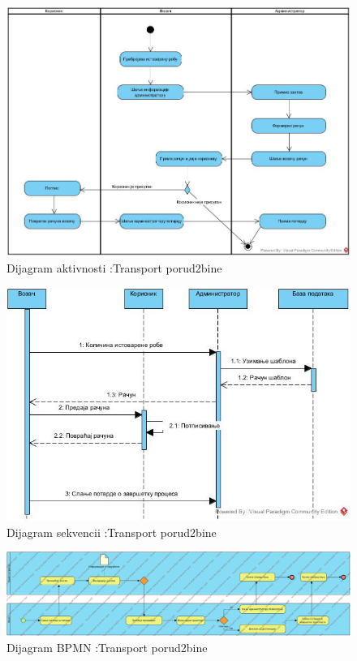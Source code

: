 \begin{figure}[H]
	\includegraphics[scale=0.4]{Slike/DFD/AD_transport.jpg}
	\centering
	\caption{Dijagram aktivnosti :Transport porud2bine}
	\label{ucDostavljanjeAktivnost}
\end{figure}
\begin{figure}[H]
	\includegraphics[scale=0.4]{Slike/DFD/DS_transport.jpg}
	\centering
	\caption{Dijagram sekvencii :Transport porud2bine}
	\label{ucDostavljanjeSekvence}
\end{figure}
\begin{figure}[H]
	\includegraphics[angle = 90, scale = 0.3]{Slike/BPMN/SUdostavljanjePorudzbineBPMN.jpg}
	\centering
	\caption{Dijagram BPMN :Transport porud2bine}
	\label{ucDostavljanjeBPMN}
\end{figure}







